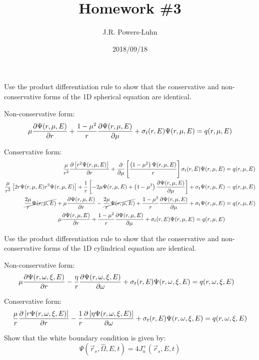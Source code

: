 \documentclass{hw}
\author{J.R. Powers-Luhn}
\date{2018/09/18}
\title{Homework \#3}
\begin{document}
\problem{}
    Use the product differentiation rule to show that the conservative and non-conservative forms of the 1D spherical equation are identical.

\solution
    Non-conservative form:
    \begin{align*}
    	\mu \pdv{\Psi (r, \mu, E)}{r} + \frac{1-\mu^2}{r} \pdv{\Psi (r, \mu, E)}{\mu} +\sigma_t(r, E) \Psi (r, \mu, E) = q(r, \mu, E)
    \end{align*}

    Conservative form:
    \begin{align*}
    	\frac{\mu}{r^2} \pdv{\left[ r^2 \Psi(r, \mu, E) \right]}{r} + \pdv{}{\mu} \left[ \frac{\left( 1 - \mu^2 \right) \Psi(r, \mu, E)}{r} \right]
    		\sigma_t (r, E) \Psi ( r, \mu, E ) &= q(r, \mu, E) \\
    	\frac{\mu}{r^2} \left[ 2 r \Psi ( r, \mu, E )  r^2 \Psi ( r, \mu, E ) \right] + 
    		\frac{1}{r} \left[ -2 \mu \Psi ( r, \mu, E ) + \left( 1 - \mu^2 \right) \pdv{\Psi ( r, \mu, E )}{\mu} \right] + 
    		\sigma_t \Psi ( r, \mu, E ) &= q(r, \mu, E) \\
    	\cancel{\frac{2 \mu}{r} \Psi ( r, \mu, E )} + \mu \pdv{\Psi ( r, \mu, E )}{r} - \cancel{\frac{2 \mu}{r} \Psi ( r, \mu, E )} +
    		\frac{1 - \mu^2}{r} \pdv{\Psi ( r, \mu, E )}{\mu} + \sigma_t \Psi ( r, \mu, E ) &= q(r, \mu, E) \\
    	\mu \pdv{\Psi (r, \mu, E)}{r} + \frac{1-\mu^2}{r} \pdv{\Psi (r, \mu, E)}{\mu} +\sigma_t(r, E) \Psi (r, \mu, E) = q(r, \mu, E)
    \end{align*}

\problem{}
    Use the product differentiation rule to show that the conservative and non-conservative forms of the 1D cylindrical equation are identical.

\solution
    Non-conservative form:
    \begin{align*}
    	\mu \pdv{\Psi( r, \omega, \xi, E )}{r} - \frac{\eta}{r} \pdv{\Psi( r, \omega, \xi, E )}{\omega} + \sigma_t(r, E) \Psi( r, \omega, \xi, E ) &= q(r, \omega, \xi, E)
    \end{align*}

    Conservative form:
    \begin{align*}
    	\frac{\mu}{r} \pdv{\left[ r \Psi( r, \omega, \xi, E ) \right]}{r} - \frac{1}{r} \pdv{\left[ \eta \Psi( r, \omega, \xi, E ) \right]}{\omega} +
    		\sigma_t ( r, E ) \Psi( r, \omega, \xi, E ) &= q(r, \omega, \xi, E) \\

    \end{align*}

\problem{}
    Show that the white boundary condition is given by: $$ \Psi(\vec{r}_s, \hat{\Omega}, E, t) = 4 J^+_n(\vec{r}_s, E, t) $$

\solution
    
\end{document}
